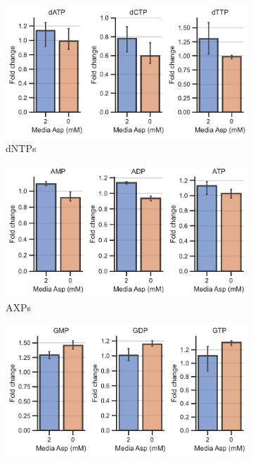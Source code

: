 \begin{figure}[!ht]
    \ContinuedFloat
    \centering
    \begin{subfigure}[b]{0.45\textwidth}
        \includegraphics[width=\textwidth]{figures/sapp/GOT_DKO_Asp_depl/143B_GOT_dntps.pdf}
        \caption{dNTPs}
        \label{fig:sapp:143B_GOT_dntps}
    \end{subfigure}
    \hfill
    \begin{subfigure}[b]{0.45\textwidth}
        \includegraphics[width=\textwidth]{figures/sapp/GOT_DKO_Asp_depl/143B_GOT_axp.pdf}
        \caption{AXPs}
        \label{fig:sapp:143B_GOT_axp}
    \end{subfigure}
    \hfill
    \begin{subfigure}[b]{0.45\textwidth}
        \includegraphics[width=\textwidth]{figures/sapp/GOT_DKO_Asp_depl/143B_GOT_gxp.pdf}

\end{subfigure}
\end{figure}
